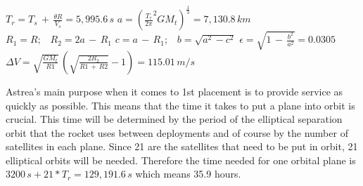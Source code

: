 \begin{center}
$T_r = T_s\,+\,\frac{\theta R}{V_s} = 5,995.6\,s$
\newline\newline
$a = (\frac{T_r}{2\pi}^2GM_t)^\frac{1}{3}=7,130.8\,km$
\newline\newline
$R_1 = R;\;\;\;R_2=2a\,-\,R_1$
\newline\newline
$c = a\,-\,R_1;\;\;\;b = \sqrt{a^2\,-c^2}$
\newline\newline
$\epsilon = \sqrt{1\,-\,\frac{b^2}{a^2}}=0.0305$
\newline\newline
$\Delta V = \sqrt{\frac{GM_t}{R1}}\,(\sqrt{\frac{2R_2}{R1\,+\,R2}}-1)=115.01\,m/s$
\newline\newline
\end{center}
Astrea's main purpose when it comes to 1st placement is to provide service as quickly as possible. This means that the time it takes to put a plane into orbit is crucial. This time will be determined by the period of the elliptical separation orbit that the rocket uses between deployments and of course by the number of satellites in each plane. Since 21 are the satellites that need to be put in orbit, 21 elliptical orbits will be needed. Therefore the time needed for one orbital plane is $3200\,s + 21*T_r = 129,191.6\,s$ which means 35.9 hours.
